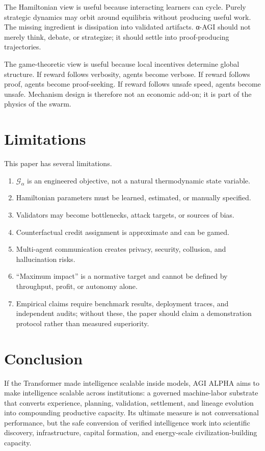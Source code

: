 \documentclass[11pt]{article}
\providecommand{\tightlist}{\setlength{\itemsep}{0pt}\setlength{\parskip}{0pt}}
\begin{document}
The Hamiltonian view is useful because interacting learners can cycle. Purely strategic dynamics may orbit around equilibria without producing useful work. The missing ingredient is dissipation into validated artifacts. α-AGI should not merely think, debate, or strategize; it should settle into proof-producing trajectories.

The game-theoretic view is useful because local incentives determine global structure. If reward follows verbosity, agents become verbose. If reward follows proof, agents become proof-seeking. If reward follows unsafe speed, agents become unsafe. Mechanism design is therefore not an economic add-on; it is part of the physics of the swarm.

\section{Limitations}\label{limitations}

This paper has several limitations.

\begin{enumerate}
\def\labelenumi{\arabic{enumi}.}
\tightlist
\item
  \(\mathcal{G}_{\alpha}\) is an engineered objective, not a natural thermodynamic state variable.
\item
  Hamiltonian parameters must be learned, estimated, or manually specified.
\item
  Validators may become bottlenecks, attack targets, or sources of bias.
\item
  Counterfactual credit assignment is approximate and can be gamed.
\item
  Multi-agent communication creates privacy, security, collusion, and hallucination risks.
\item
  ``Maximum impact'' is a normative target and cannot be defined by throughput, profit, or autonomy alone.
\item
  Empirical claims require benchmark results, deployment traces, and independent audits; without these, the paper should claim a demonstration protocol rather than measured superiority.
\end{enumerate}


\section{Conclusion}\label{conclusion}

If the Transformer made intelligence scalable inside models, AGI ALPHA aims to make intelligence scalable across institutions: a governed machine-labor substrate that converts experience, planning, validation, settlement, and lineage evolution into compounding productive capacity. Its ultimate measure is not conversational performance, but the safe conversion of verified intelligence work into scientific discovery, infrastructure, capital formation, and energy-scale civilization-building capacity.
\end{document}
